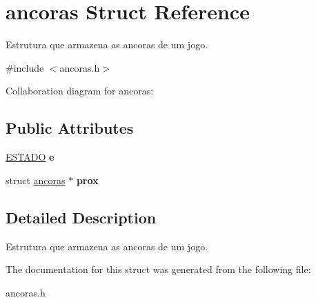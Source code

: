 \hypertarget{structancoras}{\section{ancoras Struct Reference}
\label{structancoras}
}


Estrutura que armazena as ancoras de um jogo.  




{\ttfamily \#include $<$ancoras.\+h$>$}



Collaboration diagram for ancoras\+:
\subsection*{Public Attributes}
\begin{DoxyCompactItemize}
\item 
\hypertarget{structancoras_a3b866d7101ccf74e396e0c63140468d7}{\hyperlink{estado_8h_a857f2529d823a22e6f4a81cf21fb810f}{E\+S\+T\+A\+D\+O} {\bfseries e}}\label{structancoras_a3b866d7101ccf74e396e0c63140468d7}

\item 
\hypertarget{structancoras_a55d4bae516e8f47cbf2ae67836732a51}{struct \hyperlink{structancoras}{ancoras} $\ast$ {\bfseries prox}}\label{structancoras_a55d4bae516e8f47cbf2ae67836732a51}

\end{DoxyCompactItemize}


\subsection{Detailed Description}
Estrutura que armazena as ancoras de um jogo. 

The documentation for this struct was generated from the following file\+:\begin{DoxyCompactItemize}
\item 
ancoras.\+h\end{DoxyCompactItemize}
